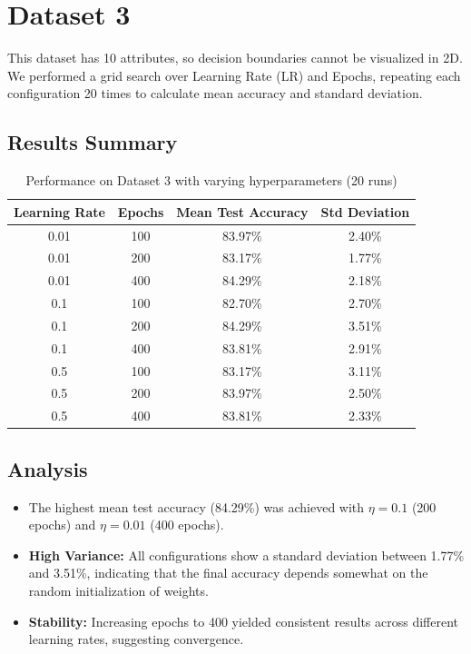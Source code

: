 \documentclass{article}
\begin{document}
\section{Dataset 3}

This dataset has 10 attributes, so decision boundaries cannot be visualized in 2D. We performed a grid search over Learning Rate (LR) and Epochs, repeating each configuration 20 times to calculate mean accuracy and standard deviation.

\subsection{Results Summary}

\begin{table}[H]
    \centering
    \begin{tabular}{|c|c|c|c|}
        \hline
        \textbf{Learning Rate} & \textbf{Epochs} & \textbf{Mean Test Accuracy} & \textbf{Std Deviation} \\
        \hline
        0.01 & 100 & 83.97\% & 2.40\% \\
        0.01 & 200 & 83.17\% & 1.77\% \\
        0.01 & 400 & 84.29\% & 2.18\% \\
        \hline
        0.1 & 100 & 82.70\% & 2.70\% \\
        0.1 & 200 & 84.29\% & 3.51\% \\
        0.1 & 400 & 83.81\% & 2.91\% \\
        \hline
        0.5 & 100 & 83.17\% & 3.11\% \\
        0.5 & 200 & 83.97\% & 2.50\% \\
        0.5 & 400 & 83.81\% & 2.33\% \\
        \hline
    \end{tabular}
    \caption{Performance on Dataset 3 with varying hyperparameters (20 runs)}
\end{table}

\subsection{Analysis}
\begin{itemize}
    \item The highest mean test accuracy (84.29\%) was achieved with $\eta=0.1$ (200 epochs) and $\eta=0.01$ (400 epochs).
    \item \textbf{High Variance:} All configurations show a standard deviation between 1.77\% and 3.51\%, indicating that the final accuracy depends somewhat on the random initialization of weights.
    \item \textbf{Stability:} Increasing epochs to 400 yielded consistent results across different learning rates, suggesting convergence.
\end{itemize}
\end{document}
